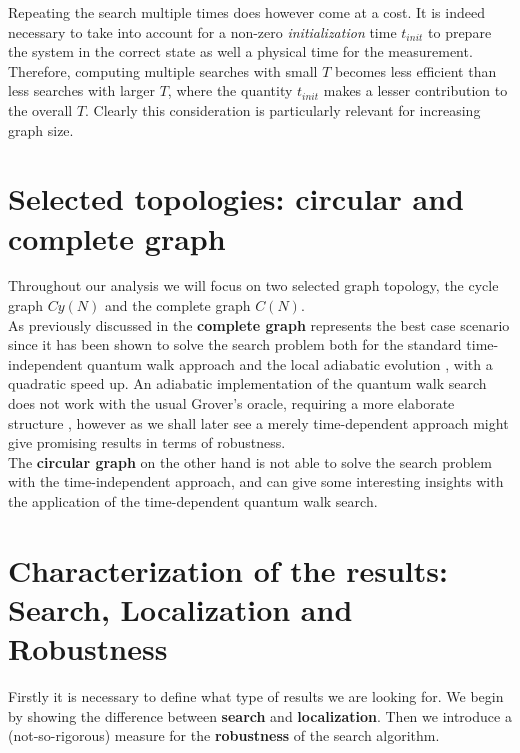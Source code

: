         Repeating the search multiple times does however come at a cost. It is indeed necessary to take into account for a non-zero \textit{initialization} time $t_{init}$ to prepare the system in the correct state as well a physical time for the measurement. Therefore, computing multiple searches with small $T$ becomes less efficient than less searches with larger $T$, where the quantity $t_{init}$ makes a lesser contribution to the overall $T$. Clearly this consideration is particularly relevant for increasing graph size.

\clearpage
\section{Selected topologies: circular and complete graph}
    Throughout our analysis we will focus on two selected graph topology, the cycle graph $Cy(N)$ and the complete graph $C(N)$. \\

    As previously discussed in  the \textbf{complete graph} represents the best case scenario since it has been shown to solve the search problem both for the standard time-independent quantum walk approach \cite{Childs2004} and the local adiabatic evolution \cite{Roland2002}, with a quadratic speed up. An adiabatic implementation of the quantum walk search does not work with the usual Grover's oracle, requiring a more elaborate structure \cite{Wong2016}, however as we shall later see a merely time-dependent approach might give promising results in terms of robustness.  \\

    The \textbf{circular graph} on the other hand is not able to solve the search problem with the time-independent approach, and can give some interesting insights with the application of the time-dependent quantum walk search.  \\


\section{Characterization of the results: Search, Localization and Robustness}
    Firstly it is necessary to define what type of results we are looking for. We begin by showing the difference between \textbf{search} and \textbf{localization}. Then we introduce a (not-so-rigorous) measure for the \textbf{robustness} of the search algorithm.

